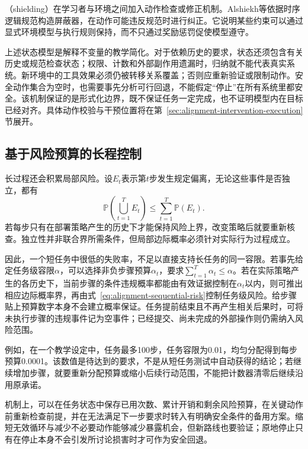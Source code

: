 （shielding）在学习者与环境之间加入动作检查或修正机制。Alshiekh等依据时序逻辑规范构造屏蔽器，在动作可能违反规范时进行纠正。它说明某些约束可以通过显式环境模型与执行规则保持，而不只通过奖励惩罚促使模型遵守。

上述状态模型是解释不变量的教学简化。对于依赖历史的要求，状态还须包含有关历史或规范检查状态；权限、计数和外部副作用遗漏时，归纳就不能代表真实系统。新环境中的工具效果必须仍被转移关系覆盖；否则应重新验证或限制动作。安全动作集合为空时，也需要事先分析可行回退，不能假定“停止”在所有系统里都安全。该机制保证的是形式化边界，既不保证任务一定完成，也不证明模型内在目标已经对齐。具体动作校验与干预位置将在第~\ref{sec:alignment-intervention-execution}节展开。

\subsection{基于风险预算的长程控制}
\label{sec:alignment-generalization-horizon}

长过程还会积累局部风险。设$E_t$表示第$t$步发生规定偏离，无论这些事件是否独立，都有
\begin{equation}
 \mathbb P\left(\bigcup_{t=1}^{T}E_t\right)
 \leq\sum_{t=1}^{T}\mathbb P(E_t).
 \label{eq:alignment-sequential-risk}
\end{equation}
若每步只有在部署策略产生的历史下才能保持风险上界，改变策略后就要重新核查。独立性并非联合界所需条件，但局部边际概率必须针对实际行为过程成立。

因此，一个短任务中很低的失败率，不足以直接支持长任务的同一容限。若事先给定任务级容限$\alpha$，可以选择非负步骤预算$\alpha_t$，要求$\sum_{t=1}^{T}\alpha_t\leq\alpha$。若在实际策略产生的各历史下，当前步骤的条件违规概率都能由有效证据控制在$\alpha_t$以内，则可推出相应边际概率界，再由式~\eqref{eq:alignment-sequential-risk}控制任务级风险。给步骤贴上预算数字本身不会建立概率保证。任务提前结束且不再产生相关后果时，可将未执行步骤的违规事件记为空事件；已经提交、尚未完成的外部操作则仍需纳入风险范围。

例如，在一个教学设定中，任务最多100步，任务容限为0.01，均匀分配得到每步预算0.0001。该数值是待达到的要求，不是从短任务测试中自动获得的结论；若继续增加步骤，就要重新分配预算或缩小后续行动范围，不能把计数器清零后继续沿用原承诺。

机制上，可以在任务状态中保存已用次数、累计开销和剩余风险预算，在关键动作前重新检查前提，并在无法满足下一步要求时转入有明确安全条件的备用方案。缩短无效循环与减少不必要动作能够减少暴露机会，但新路线也要验证；原地停止只有在停止本身不会引发所讨论损害时才可作为安全回退。

